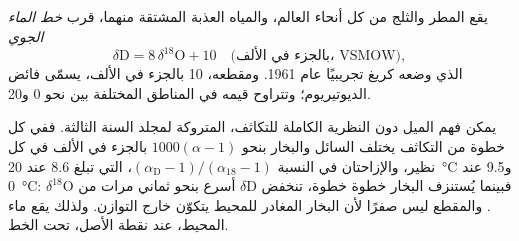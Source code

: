 \begin{proposition}\label{prop:b2:isotope-geochemistry:mwl}
يقع المطر والثلج من كل أنحاء العالم، والمياه العذبة المشتقة منهما،
قرب \emph{خط الماء الجوي}
\[
  \delta\mathrm{D} = 8\,\delta^{18}\mathrm{O} + 10 \quad\text{(بالجزء في الألف، VSMOW)},
\]
الذي وضعه كريغ تجريبيًا عام 1961. ومقطعه، 10 بالجزء في الألف، يسمّى
فائض الديوتيريوم؛ وتتراوح قيمه في المناطق المختلفة بين نحو 0 و20.
\end{proposition}
\admitted

\noindent يمكن فهم الميل دون النظرية الكاملة للتكاثف،
المتروكة لمجلد السنة الثالثة. ففي كل خطوة من التكاثف يختلف السائل
والبخار بنحو $1000(\alpha - 1)$ بالجزء في الألف في كل نظير،
والإزاحتان في النسبة $(\alpha_{\mathrm D}-1)/(\alpha_{18}-1)$، التي
تبلغ 8.6 عند \qty{20}{\degreeCelsius} و9.5 عند \qty{0}{\degreeCelsius}: فبينما
يُستنزف البخار خطوة خطوة، تنخفض $\delta\mathrm{D}$ أسرع بنحو ثماني مرات
من $\delta^{18}\mathrm{O}$. والمقطع ليس صفرًا لأن البخار المغادر
للمحيط يتكوّن خارج التوازن. ولذلك يقع ماء المحيط، عند نقطة الأصل،
تحت الخط.

